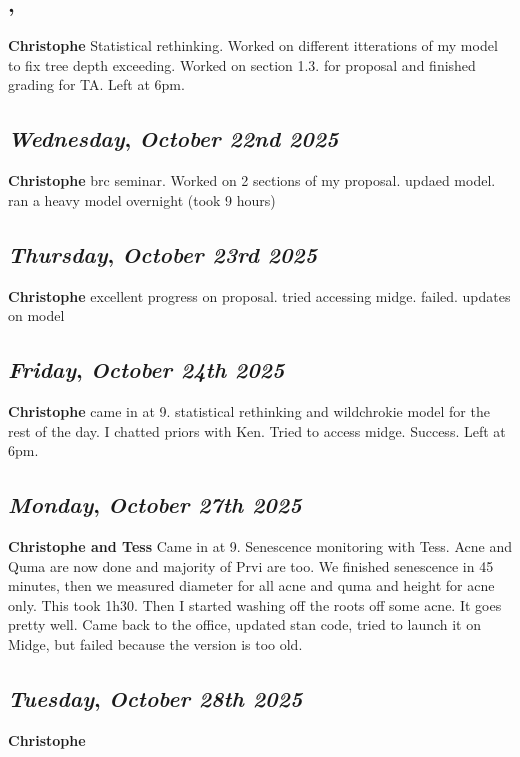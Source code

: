 \subsection*{\weekday, \day}
\textbf {Christophe}
Statistical rethinking. Worked on different itterations of my model to fix tree depth exceeding. Worked on section 1.3. for proposal and finished grading for TA. Left at 6pm.

\def\day{\textit{October 22nd 2025}}
\def\weekday{\textit{Wednesday}}
\subsection*{\weekday, \day}
\textbf {Christophe}
brc seminar. Worked on 2 sections of my proposal. updaed model. ran a heavy model overnight (took 9 hours)

\def\day{\textit{October 23rd 2025}}
\def\weekday{\textit{Thursday}}
\subsection*{\weekday, \day}
\textbf {Christophe}
excellent progress on proposal. tried accessing midge. failed. updates on model

\def\day{\textit{October 24th 2025}}
\def\weekday{\textit{Friday}}
\subsection*{\weekday, \day}
\textbf {Christophe}
came in at 9. statistical rethinking and wildchrokie model for the rest of the day. I chatted priors with Ken. Tried to access midge. Success. Left at 6pm. 

\def\day{\textit{October 27th 2025}}
\def\weekday{\textit{Monday}}
\subsection*{\weekday, \day}
\textbf {Christophe and Tess}
Came in at 9. Senescence monitoring with Tess. Acne and Quma are now done and majority of Prvi are too. We finished senescence in 45 minutes, then we measured diameter for all acne and quma and height for acne only. This took 1h30. Then I started washing off the roots off some acne. It goes pretty well. Came back to the office, updated stan code, tried to launch it on Midge, but failed because the version is too old.

\def\day{\textit{October 28th 2025}}
\def\weekday{\textit{Tuesday}}
\subsection*{\weekday, \day}
\textbf {Christophe}

